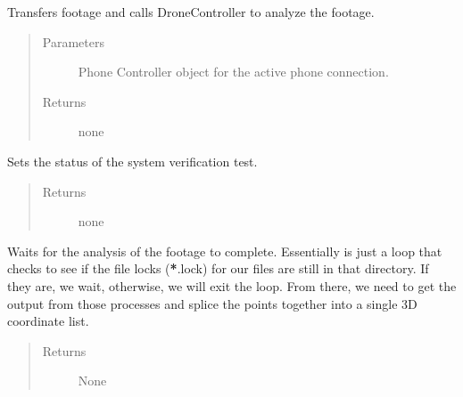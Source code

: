 \documentclass[letterpaper,10pt,english]{sphinxmanual}
\begin{document}
\begin{fulllineitems}
\begin{fulllineitems}
\label{\detokenize{index:src.Controllers.Program_Controller.Controller.transfer_footage}}
Transfers footage and calls DroneController to analyze the footage.
\begin{quote}\begin{description}
\item[{Parameters}] \leavevmode
{} \textendash{} Phone Controller object for the active phone connection.

\item[{Returns}] \leavevmode
none

\end{description}\end{quote}

\end{fulllineitems}


\begin{fulllineitems}
\label{\detokenize{index:src.Controllers.Program_Controller.Controller.updateFlightStatus}}
Sets the status of the system verification test.
\begin{quote}\begin{description}
\item[{Returns}] \leavevmode
none

\end{description}\end{quote}

\end{fulllineitems}


\begin{fulllineitems}
\label{\detokenize{index:src.Controllers.Program_Controller.Controller.wait_for_analysis}}
Waits for the analysis of the footage to complete. Essentially is just a loop that checks to
see if the file locks ({\color{red}\bfseries{}*}.lock) for our files are still in that directory. If they are, we wait,
otherwise, we will exit the loop. From there, we need to get the output from those processes and splice
the points together into a single 3D coordinate list.
\begin{quote}\begin{description}
\item[{Returns}] \leavevmode
None


\end{description}
\end{quote}
\end{fulllineitems}
\end{fulllineitems}
\end{document}
